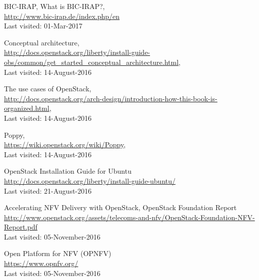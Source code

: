 \begin{thebibliography}{10}


BIC-IRAP,
What is BIC-IRAP?,
\\\url{http://www.bic-irap.de/index.php/en}
\\Last visited: 01-Mar-2017

Conceptual architecture,
\\\url{http://docs.openstack.org/liberty/install-guide-obs/common/get_started_conceptual_architecture.html},
\\Last visited: 14-August-2016

The use cases of OpenStack,
\\\url{http://docs.openstack.org/arch-design/introduction-how-this-book-is-organized.html},
\\Last visited: 14-August-2016

Poppy,
\\\url{https://wiki.openstack.org/wiki/Poppy},
\\Last visited: 14-August-2016

OpenStack Installation Guide for Ubuntu
\\\url{http://docs.openstack.org/liberty/install-guide-ubuntu/}
\\Last visited: 21-August-2016

Accelerating NFV Delivery with OpenStack, OpenStack Foundation Report
\\\url{http://www.openstack.org/assets/telecoms-and-nfv/OpenStack-Foundation-NFV-Report.pdf}
\\Last visited: 05-November-2016

Open Platform for NFV (OPNFV)
\\\url{https://www.opnfv.org/}
\\Last visited: 05-November-2016


\end{thebibliography}
